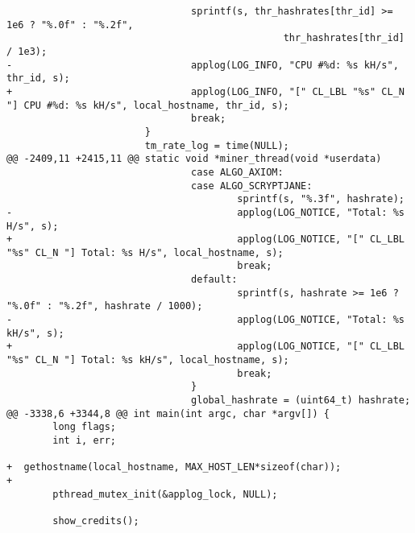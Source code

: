 \begin{lstlisting}
                                sprintf(s, thr_hashrates[thr_id] >= 1e6 ? "%.0f" : "%.2f",
                                                thr_hashrates[thr_id] / 1e3);
-                               applog(LOG_INFO, "CPU #%d: %s kH/s", thr_id, s);
+                               applog(LOG_INFO, "[" CL_LBL "%s" CL_N "] CPU #%d: %s kH/s", local_hostname, thr_id, s);
                                break;
                        }
                        tm_rate_log = time(NULL);
@@ -2409,11 +2415,11 @@ static void *miner_thread(void *userdata)
                                case ALGO_AXIOM:
                                case ALGO_SCRYPTJANE:
                                        sprintf(s, "%.3f", hashrate);
-                                       applog(LOG_NOTICE, "Total: %s H/s", s);
+                                       applog(LOG_NOTICE, "[" CL_LBL "%s" CL_N "] Total: %s H/s", local_hostname, s);
                                        break;
                                default:
                                        sprintf(s, hashrate >= 1e6 ? "%.0f" : "%.2f", hashrate / 1000);
-                                       applog(LOG_NOTICE, "Total: %s kH/s", s);
+                                       applog(LOG_NOTICE, "[" CL_LBL "%s" CL_N "] Total: %s kH/s", local_hostname, s);
                                        break;
                                }
                                global_hashrate = (uint64_t) hashrate;
@@ -3338,6 +3344,8 @@ int main(int argc, char *argv[]) {
        long flags;
        int i, err;

+  gethostname(local_hostname, MAX_HOST_LEN*sizeof(char));
+
        pthread_mutex_init(&applog_lock, NULL);

        show_credits();
\end{lstlisting}

